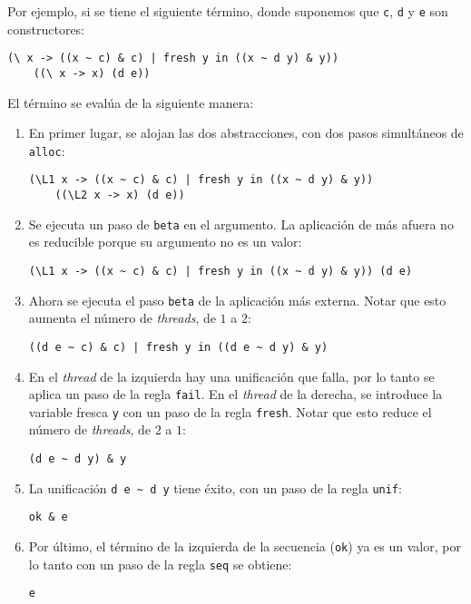 Por ejemplo, si se tiene el siguiente término, donde suponemos que
\texttt{c}, \texttt{d} y \texttt{e} son constructores:
\begin{lstlisting}[]
(\ x -> ((x ~ c) & c) | fresh y in ((x ~ d y) & y))
    ((\ x -> x) (d e))
\end{lstlisting}
El término se evalúa de la siguiente manera:
\begin{enumerate}
\item
En primer lugar, se alojan las dos abstracciones, con dos pasos simultáneos de \texttt{alloc}:
\begin{lstlisting}[mathescape=true]
(\L1 x -> ((x ~ c) & c) | fresh y in ((x ~ d y) & y))
    ((\L2 x -> x) (d e))
\end{lstlisting}
\item
Se ejecuta un paso de \texttt{beta} en el argumento.
La aplicación de más afuera no es reducible porque su argumento no es
un valor:
\begin{lstlisting}[mathescape=true]
(\L1 x -> ((x ~ c) & c) | fresh y in ((x ~ d y) & y)) (d e)
\end{lstlisting}
\item
Ahora se ejecuta el paso \texttt{beta} de la aplicación más externa.
Notar que esto aumenta el número de {\em threads}, de $1$ a $2$:
\begin{lstlisting}[mathescape=true]
((d e ~ c) & c) | fresh y in ((d e ~ d y) & y)
\end{lstlisting}
\item
En el {\em thread} de la izquierda hay una unificación que falla,
por lo tanto se aplica un paso de la regla \texttt{fail}.
En el {\em thread} de la derecha, se introduce la variable fresca \texttt{y}
con un paso de la regla \texttt{fresh}.
Notar que esto reduce el número de {\em threads}, de $2$ a $1$:
\begin{lstlisting}[mathescape=true]
(d e ~ d y) & y
\end{lstlisting}
\item
La unificación \verb|d e ~ d y| tiene éxito, con un paso de la regla
\texttt{unif}:
\begin{lstlisting}[mathescape=true]
ok & e
\end{lstlisting}
\item
Por último, el término de la izquierda de la secuencia (\texttt{ok})
ya es un valor, por lo tanto con un paso de la regla \texttt{seq}
se obtiene:
\begin{lstlisting}[mathescape=true]
e
\end{lstlisting}
\end{enumerate}

